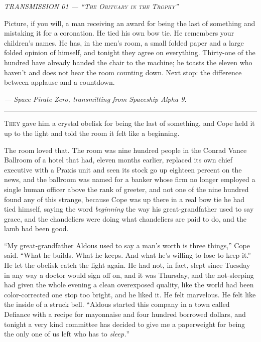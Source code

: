 \documentclass[11pt,openany]{book}
\newcommand{\transheader}{\normalfont\footnotesize\scshape\letterspace}
\newcommand{\letterspace}{}
\newenvironment{transmission}{%
  \par\vspace{0.3\baselineskip}\begin{center}\begin{minipage}{0.88\textwidth}%
  \itshape\small\setlength{\parindent}{0pt}\setstretch{1.06}}%
  {\end{minipage}\end{center}\vspace{0.4\baselineskip}%
  \noindent\hfil\rule{0.35\textwidth}{0.3pt}\hfil\par\vspace{1.0\baselineskip}}
\begin{document}
\begin{transmission}
{\transheader TRANSMISSION 01 --- ``The Obituary in the Trophy''}\par\vspace{0.5em}
Picture, if you will, a man receiving an award for being the last of something and mistaking it for a coronation. He tied his own bow tie. He remembers your children's names. He has, in the men's room, a small folded paper and a large folded opinion of himself, and tonight they agree on everything. Thirty-one of the hundred have already handed the chair to the machine; he toasts the eleven who haven't and does not hear the room counting down. Next stop: the difference between applause and a countdown.\par
\vspace{0.5em}\hfill\textit{--- Space Pirate Zero, transmitting from Spaceship Alpha 9.}\par
\end{transmission}


\lettrine[lines=3, lhang=0.05, nindent=0.25em]{T}{hey} gave him a crystal obelisk for being the last of something, and Cope held it up to the light and told the room it felt like a beginning.

The room loved that. The room was nine hundred people in the Conrad Vance Ballroom of a hotel that had, eleven months earlier, replaced its own chief executive with a Praxis unit and seen its stock go up eighteen percent on the news, and the ballroom was named for a banker whose firm no longer employed a single human officer above the rank of greeter, and not one of the nine hundred found any of this strange, because Cope was up there in a real bow tie he had tied himself, saying the word \textit{beginning} the way his great-grandfather used to say grace, and the chandeliers were doing what chandeliers are paid to do, and the lamb had been good.

``My great-grandfather Aldous used to say a man's worth is three things,'' Cope said. ``What he builds. What he keeps. And what he's willing to lose to keep it.'' He let the obelisk catch the light again. He had not, in fact, slept since Tuesday in any way a doctor would sign off on, and it was Thursday, and the not-sleeping had given the whole evening a clean overexposed quality, like the world had been color-corrected one stop too bright, and he liked it. He felt marvelous. He felt like the inside of a struck bell. ``Aldous started this company in a town called Defiance with a recipe for mayonnaise and four hundred borrowed dollars, and tonight a very kind committee has decided to give me a paperweight for being the only one of us left who has to \textit{sleep.}''
\end{document}

